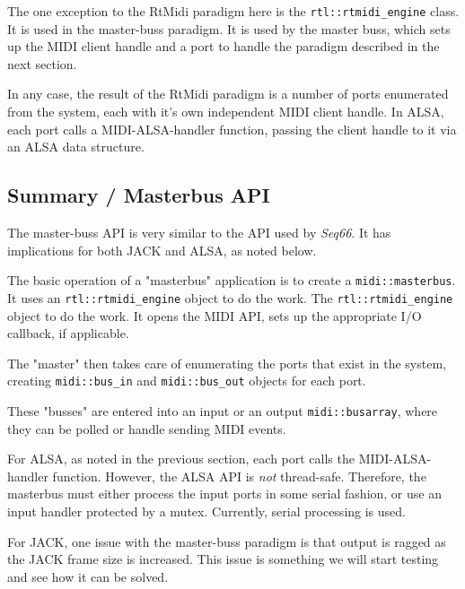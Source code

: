    The one exception to the RtMidi paradigm here is the
   \texttt{rtl::rtmidi\_engine} class.
   It is used in the master-buss paradigm.
   It is used by the master buss, which sets up the MIDI client
   handle and a port to
   handle the paradigm described in the next section.

   In any case, the result of the RtMidi paradigm is a number of
   ports enumerated from the system, each with it's own independent
   MIDI client handle. In ALSA, each port calls a MIDI-ALSA-handler
   function, passing the client handle to it via an ALSA data
   structure.
   
\subsection{Summary / Masterbus API}
\label{subsec:summary_masterbus_api}

   The master-buss API is very similar to the API used by
   \textsl{Seq66}. It has implications for both JACK and ALSA,
   as noted below.

   The basic operation of a "masterbus" application is to create a
   \texttt{midi::masterbus}.
   It uses an \texttt{rtl::rtmidi\_engine} object to do the work.
   The \texttt{rtl::rtmidi\_engine} object to do the work.
   It opens the MIDI API, sets up the appropriate I/O callback, if
   applicable.

   The "master" then takes care of enumerating the ports that
   exist in the system, creating
   \texttt{midi::bus\_in} and
   \texttt{midi::bus\_out} objects for each port.

   These "busses" are entered into an input or an output
   \texttt{midi::busarray}, where they can be polled or
   handle sending MIDI events.

   For ALSA, as noted in the previous section,
   each port calls the MIDI-ALSA-handler function.
   However, the ALSA API is \textsl{not} thread-safe.
   Therefore, the masterbus must either process the input
   ports in some serial fashion, or use an input handler protected
   by a mutex.  Currently, serial processing is used.

   For JACK, one issue with the master-buss paradigm is that output is
   ragged as the JACK frame size is increased. This issue is something
   we will start testing and see how it can be solved.

